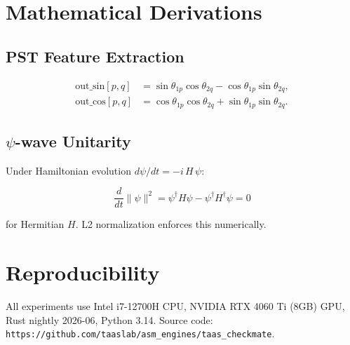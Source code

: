 \documentclass[twocolumn,10pt]{article}
\newcommand{\psiwave}{$\psi$-wave}
\begin{document}
\section{Mathematical Derivations}

\subsection{PST Feature Extraction}

\begin{align}
\text{out\_sin}[p,q] &= \sin\theta_{1p}\cos\theta_{2q} - \cos\theta_{1p}\sin\theta_{2q}, \\
\text{out\_cos}[p,q] &= \cos\theta_{1p}\cos\theta_{2q} + \sin\theta_{1p}\sin\theta_{2q}.
\end{align}

\subsection{\psiwave{} Unitarity}

Under Hamiltonian evolution $d\psi/dt = -i\,H\,\psi$:

\begin{equation}
\frac{d}{dt}\|\psi\|^2 = \psi^\dagger H\psi - \psi^\dagger H^\dagger\psi = 0
\end{equation}

for Hermitian $H$. L2 normalization enforces this numerically.

\section{Reproducibility}

All experiments use Intel i7-12700H CPU, NVIDIA RTX 4060 Ti (8GB) GPU, Rust nightly 2026-06, Python 3.14. Source code: \texttt{https://github.com/taaslab/asm\_engines/taas\_checkmate}.
\end{document}
